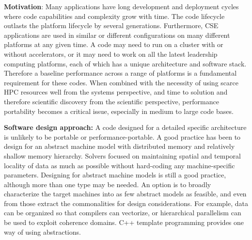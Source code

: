 \documentclass[]{article}
\date{}
\begin{document}
\pagestyle{fancy}
\renewcommand{\headrulewidth}{0pt}
  
\thispagestyle{empty}
\textbf{\newline}
\textbf{\newline}
\textbf{\newline}

\textbf{Motivation}: Many applications have long development and
deployment cycles where code capabilities and complexity grow with time.
The code lifecycle outlasts the platform lifecycle by several
generations. Furthermore, CSE applications are used in similar or
different configurations on many different platforms at any given time.
A code may need to run on a cluster with or without accelerators, or it
may need to work on all the latest leadership computing platforms, each
of which has a unique architecture and software stack. Therefore a
baseline performance across a range of platforms is a fundamental
requirement for these codes. When combined with the necessity of using
scarce HPC resources well from the systems perspective, and time to
solution and therefore scientific discovery from the scientific
perspective, performance portability becomes a critical issue,
especially in medium to large code bases.

\textbf{Software design approach:} A code designed for a detailed
specific architecture is unlikely to be portable or
performance-portable. A good practice has been to design for an abstract
machine model with distributed memory and relatively shallow memory
hierarchy. Solvers focused on maintaining spatial and temporal locality
of data as much as possible without hard-coding any machine-specific
parameters. Designing for abstract machine models is still a good
practice, although more than one type may be needed. An option is to
broadly characterize the target machines into as few abstract models as
feasible, and even from those extract the commonalities for design
considerations. For example, data can be organized so that compilers can
vectorize, or hierarchical parallelism can be used to exploit coherence
domains. C++ template programming provides one way of using
abstractions.
\end{document}
